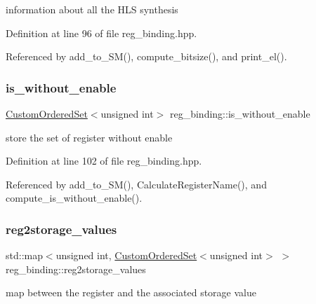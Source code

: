information about all the H\+LS synthesis 



Definition at line 96 of file reg\+\_\+binding.\+hpp.



Referenced by add\+\_\+to\+\_\+\+S\+M(), compute\+\_\+bitsize(), and print\+\_\+el().

\mbox{\label{classreg__binding_ad7f2d5e7ac076a71847765dd8c7e3b75}} 
\subsubsection{\texorpdfstring{is\+\_\+without\+\_\+enable}{is\_without\_enable}}
{\footnotesize\ttfamily \hyperlink{classCustomOrderedSet}{Custom\+Ordered\+Set}$<$unsigned int$>$ reg\+\_\+binding\+::is\+\_\+without\+\_\+enable\hspace{0.3cm}{\ttfamily [protected]}}



store the set of register without enable 



Definition at line 102 of file reg\+\_\+binding.\+hpp.



Referenced by add\+\_\+to\+\_\+\+S\+M(), Calculate\+Register\+Name(), and compute\+\_\+is\+\_\+without\+\_\+enable().

\mbox{\label{classreg__binding_a297e1876e3d97faee75b5db688dedfa1}} 
\subsubsection{\texorpdfstring{reg2storage\+\_\+values}{reg2storage\_values}}
{\footnotesize\ttfamily std\+::map$<$unsigned int, \hyperlink{classCustomOrderedSet}{Custom\+Ordered\+Set}$<$unsigned int$>$ $>$ reg\+\_\+binding\+::reg2storage\+\_\+values\hspace{0.3cm}{\ttfamily [protected]}}



map between the register and the associated storage value 



